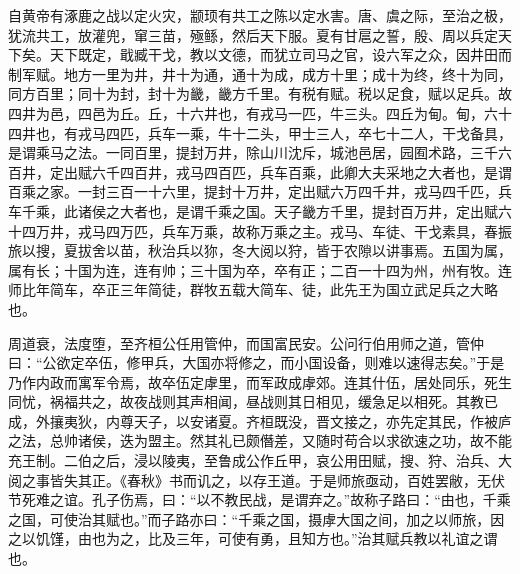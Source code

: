\documentclass[12pt,UTF8]{ctexbook}
\begin{document}
自黄帝有涿鹿之战以定火灾，颛顼有共工之陈以定水害。唐、虞之际，至治之极，犹流共工，放灌兜，窜三苗，殛鲧，然后天下服。夏有甘扈之誓，殷、周以兵定天下矣。天下既定，戢臧干戈，教以文德，而犹立司马之官，设六军之众，因井田而制军赋。地方一里为井，井十为通，通十为成，成方十里；成十为终，终十为同，同方百里；同十为封，封十为畿，畿方千里。有税有赋。税以足食，赋以足兵。故四井为邑，四邑为丘。丘，十六井也，有戎马一匹，牛三头。四丘为甸。甸，六十四井也，有戎马四匹，兵车一乘，牛十二头，甲士三人，卒七十二人，干戈备具，是谓乘马之法。一同百里，提封万井，除山川沈斥，城池邑居，园囿术路，三千六百井，定出赋六千四百井，戎马四百匹，兵车百乘，此卿大夫采地之大者也，是谓百乘之家。一封三百一十六里，提封十万井，定出赋六万四千井，戎马四千匹，兵车千乘，此诸侯之大者也，是谓千乘之国。天子畿方千里，提封百万井，定出赋六十四万井，戎马四万匹，兵车万乘，故称万乘之主。戎马、车徒、干戈素具，春振旅以搜，夏拔舍以苗，秋治兵以狝，冬大阅以狩，皆于农隙以讲事焉。五国为属，属有长；十国为连，连有帅；三十国为卒，卒有正；二百一十四为州，州有牧。连师比年简车，卒正三年简徒，群牧五载大简车、徒，此先王为国立武足兵之大略也。



周道衰，法度堕，至齐桓公任用管仲，而国富民安。公问行伯用师之道，管仲曰：“公欲定卒伍，修甲兵，大国亦将修之，而小国设备，则难以速得志矣。”于是乃作内政而寓军令焉，故卒伍定虖里，而军政成虖郊。连其什伍，居处同乐，死生同忧，祸福共之，故夜战则其声相闻，昼战则其日相见，缓急足以相死。其教已成，外攘夷狄，内尊天子，以安诸夏。齐桓既没，晋文接之，亦先定其民，作被庐之法，总帅诸侯，迭为盟主。然其礼已颇僭差，又随时苟合以求欲速之功，故不能充王制。二伯之后，浸以陵夷，至鲁成公作丘甲，哀公用田赋，搜、狩、治兵、大阅之事皆失其正。《春秋》书而讥之，以存王道。于是师旅亟动，百姓罢敝，无伏节死难之谊。孔子伤焉，曰：“以不教民战，是谓弃之。”故称子路曰：“由也，千乘之国，可使治其赋也。”而子路亦曰：“千乘之国，摄虖大国之间，加之以师旅，因之以饥馑，由也为之，比及三年，可使有勇，且知方也。”治其赋兵教以礼谊之谓也。
\end{document}
